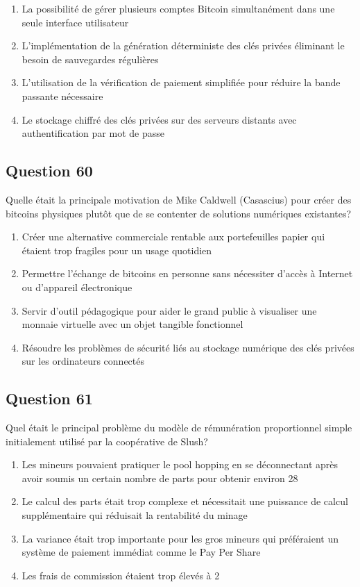 \documentclass[12pt,a4paper]{article}
\begin{document}
\begin{enumerate}[label=\Alph*., leftmargin=*]
\item La possibilité de gérer plusieurs comptes Bitcoin simultanément dans une seule interface utilisateur
\item L'implémentation de la génération déterministe des clés privées éliminant le besoin de sauvegardes régulières
\item L'utilisation de la vérification de paiement simplifiée pour réduire la bande passante nécessaire
\item Le stockage chiffré des clés privées sur des serveurs distants avec authentification par mot de passe
\end{enumerate}

\bigskip


\subsection*{Question 60}
Quelle était la principale motivation de Mike Caldwell (Casascius) pour créer des bitcoins physiques plutôt que de se contenter de solutions numériques existantes?

\begin{enumerate}[label=\Alph*., leftmargin=*]
\item Créer une alternative commerciale rentable aux portefeuilles papier qui étaient trop fragiles pour un usage quotidien
\item Permettre l'échange de bitcoins en personne sans nécessiter d'accès à Internet ou d'appareil électronique
\item Servir d'outil pédagogique pour aider le grand public à visualiser une monnaie virtuelle avec un objet tangible fonctionnel
\item Résoudre les problèmes de sécurité liés au stockage numérique des clés privées sur les ordinateurs connectés
\end{enumerate}

\bigskip


\subsection*{Question 61}
Quel était le principal problème du modèle de rémunération proportionnel simple initialement utilisé par la coopérative de Slush?

\begin{enumerate}[label=\Alph*., leftmargin=*]
\item Les mineurs pouvaient pratiquer le pool hopping en se déconnectant après avoir soumis un certain nombre de parts pour obtenir environ 28%
\item Le calcul des parts était trop complexe et nécessitait une puissance de calcul supplémentaire qui réduisait la rentabilité du minage
\item La variance était trop importante pour les gros mineurs qui préféraient un système de paiement immédiat comme le Pay Per Share
\item Les frais de commission étaient trop élevés à 2%
\end{enumerate}
\end{document}
